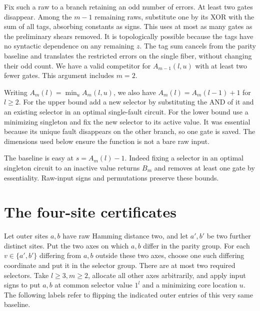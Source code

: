 \documentclass[11pt]{article}
\begin{document}
Fix such a raw to a branch retaining an odd number of errors. At least two gates disappear. Among the \(m-1\) remaining raws, substitute one by its XOR with the sum of all tags, absorbing constants as signs. This uses at most as many gates as the preliminary shears removed. It is topologically possible because the tags have no syntactic dependence on any remaining \(z\). The tag sum cancels from the parity baseline and translates the restricted errors on the single fiber, without changing their odd count. We have a valid competitor for \(A_{m-1}(l,u)\) with at least two fewer gates. This argument includes \(m=2\).

Writing \(A_m(l)=\min_u A_m(l,u)\), we also have \(A_m(l)=A_m(l-1)+1\) for \(l\ge2\). For the upper bound add a new selector by substituting the AND of it and an existing selector in an optimal single-fault circuit. For the lower bound use a minimizing singleton and fix the new selector to its active value. It was essential because its unique fault disappears on the other branch, so one gate is saved. The dimensions used below ensure the function is not a bare raw input.

The baseline is easy at \(s=A_m(l)-1\). Indeed fixing a selector in an optimal singleton circuit to an inactive value returns \(B_m\) and removes at least one gate by essentiality. Raw-input signs and permutations preserve these bounds.

\section{The four-site certificates}

Let outer sites \(a,b\) have raw Hamming distance two, and let \(a',b'\) be two further distinct sites. Put the two axes on which \(a,b\) differ in the parity group. For each \(v\in\{a',b'\}\) differing from \(a,b\) outside these two axes, choose one such differing coordinate and put it in the selector group. There are at most two required selectors. Take \(l\ge3,m\ge2\), allocate all other axes arbitrarily, and apply input signs to put \(a,b\) at common selector value \(1^l\) and a minimizing core location \(u\). The following labels refer to flipping the indicated outer entries of this very same baseline.
\end{document}
